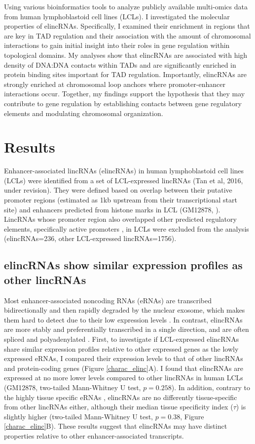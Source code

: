 \documentclass[11pt,a4paper]{report}
\begin{document}
Using various bioinformatics tools to analyze publicly available multi-omics data from human lymphoblastoid cell lines (LCLs). I investigated the molecular properties of elincRNAs. Specifically, I examined their enrichment in regions that are key in TAD regulation and their association with the amount of chromosomal interactions to gain initial insight into their roles in gene regulation within topological domains. My analyses show that elincRNAs are associated with high density of DNA:DNA contacts within TADs and are significantly enriched in protein binding sites important for TAD regulation. Importantly, elincRNAs are strongly enriched at chromosomal loop anchors where promoter-enhancer interactions occur. Together, my findings support the hypothesis that they may contribute to gene regulation by establishing contacts between gene regulatory elements and modulating chromosomal organization.

\section*{Results}

Enhancer-associated lincRNAs (elincRNAs) in human lymphoblastoid cell lines (LCLs) were identified from a set of LCL-expressed lincRNAs (Tan et al, 2016, under revision). They were defined based on overlap between their putative promoter regions (estimated as 1kb upstream from their transcriptional start site) and enhancers predicted from histone marks in LCL (GM12878, \cite{ENCODEProject2012}⁠). LincRNAs whose promoter region also overlapped other predicted regulatory elements, specifically active promoters \cite{ENCODEProject2012}⁠, in LCLs were excluded from the analysis (elincRNAs=236, other LCL-expressed lincRNAs=1756).

\subsection*{elincRNAs show similar expression profiles as other lincRNAs}

Most enhancer-associated noncoding RNAs (eRNAs) are transcribed bidirectionally and then rapidly degraded by the nuclear exosome, which makes them hard to detect due to their low expression levels \cite{Darrow2013} \cite{Lam2014}⁠. In contrast, elincRNAs are more stably and preferentially transcribed in a single direction, and are often spliced and polyadenylated \cite{Marques2013a}⁠. 
First, to investigate if LCL-expressed elincRNAs share similar expression profiles relative to other expressed genes as the lowly expressed eRNAs, I compared  their expression levels to that of other lincRNAs and protein-coding genes (Figure \ref{charac_elinc}A). I found that elincRNAs are expressed at no more lower levels compared to other lincRNAs in human LCLs (GM12878, two-tailed Mann-Whitney U test, $p=0.258$). In addition, contrary to the highly tissue specific eRNAs \cite{Wu2014}, elincRNAs are no differently tissue-specific from other lincRNAs either, although their median tissue specificity index ($\tau$) is slightly higher (two-tailed Mann-Whitney U test, $p=0.38$, Figure \ref{charac_elinc}B). These results suggest that elincRNAs may have distinct properties relative to other enhancer-associated transcripts.
\end{document}
